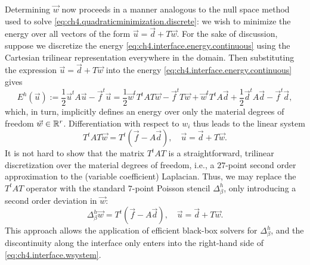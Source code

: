 Determining $\vec{w}$ now proceeds in a manner analogous to the null space method used to solve \eqref{eq:ch4.quadraticminimization.discrete}: we wish to minimize the energy over all vectors of the form $\vec{u} = \vec{d} + T \vec{w}$. For the sake of discussion, suppose we discretize the energy \eqref{eq:ch4.interface.energy.continuous} using the Cartesian trilinear representation everywhere in the domain. Then substituting the expression $\vec{u} = \vec{d} + T \vec{w}$ into the energy \eqref{eq:ch4.interface.energy.continuous} gives
\begin{equation*}
E^h(\vec{u}) := \frac{1}{2} \vec{u}^t A \vec{u} - \vec{f}^t \vec{u} = \frac{1}{2} \vec{w}^t T^tAT \vec{w} - \vec{f}^t T \vec{w} + \vec{w}^t T^tA \vec{d} + \frac{1}{2} \vec{d}^t A \vec{d} - \vec{f}^t \vec{d},
\end{equation*}
which, in turn, implicitly defines an energy over only the material degrees of freedom $\vec{w} \in \mathbb{R}^r$. Differentiation with respect to $w_i$ thus leads to the linear system
\begin{equation*}
T^tAT \vec{w} = T^t (\vec{f} - A \vec{d}), \quad \vec{u} = \vec{d} + T \vec{w}.
\end{equation*}
It is not hard to show that the matrix $T^tAT$ is a straightforward, trilinear discretization over the material degrees of freedom, i.e., a $27$-point second order approximation to the (variable coefficient) Laplacian. Thus, we may replace the $T^tAT$ operator with the standard $7$-point Poisson stencil $\Delta_{\beta}^h$, only introducing a second order deviation in $\vec{w}$:
\begin{equation} \label{eq:ch4.interface.wsystem}
\Delta_{\beta}^h \vec{w} = T^t (\vec{f} - A \vec{d}), \quad \vec{u} = \vec{d} + T \vec{w}.
\end{equation}
This approach allows the application of efficient black-box solvers for $\Delta_{\beta}^h$, and the discontinuity along the interface only enters into the right-hand side of \eqref{eq:ch4.interface.wsystem}.

